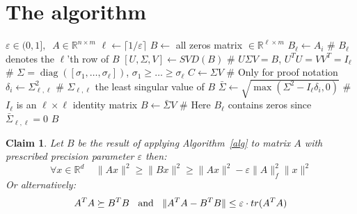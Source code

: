 \documentclass[]{article}
\newcommand{\R}{{\mathbb R}}
\newcommand{\eps}{\varepsilon}
\newcommand{\diag}{\operatorname{diag}}
\newcommand{\FD}{Frequent-Directions}
\newtheorem{claim}{Claim}
\begin{document}
\section{The algorithm}\label{thealg}

\begin{algorithm} 
\caption{\FD}
\label{alg}
\begin{algorithmic}
 $\eps \in (0,1], \;\;A \in \R^{n \times m}$ 
\STATE $\ell \leftarrow \lceil 1/\eps \rceil$
\STATE $B \leftarrow $ all zeros matrix $\in \R^{\ell \times m}$  
	\STATE $B_{\ell} \leftarrow A_i$  \hfill \# $B_{\ell}$ denotes the $\ell$'th row of $B$
	\STATE $[U,\Sigma,V] \leftarrow SVD(B)$  \hfill \# $U \Sigma V = B$,  \;$U^{T}U = VV^{T} = I_{\ell}$
	\STATE \hfill \# $\Sigma = \diag([\sigma_1,\ldots,\sigma_\ell])$,  \;$\sigma_1 \ge \ldots \ge \sigma_\ell$
	\STATE $C \leftarrow  \Sigma V$  \hfill \# Only for proof notation
	\STATE $\delta_i \leftarrow \Sigma_{\ell,\ell}^2$ \hfill \# $\Sigma_{\ell,\ell}$ the least singular value of $B$
	\STATE $\bar{\Sigma} \leftarrow \sqrt{\max(\Sigma^2 - I_{\ell}\delta_i,0)}$ \hfill \# $I_{\ell}$ is an $\ell \times \ell$ identity matrix
	\STATE $B \leftarrow \bar{\Sigma} V$ \hfill \# Here $B_{\ell}$ contains zeros since $\bar{\Sigma}_{\ell,\ell} = 0$
\ENDFOR
{} $B$ 
\end{algorithmic}
\end{algorithm}

\begin{claim}
Let $B$ be the result of applying Algorithm~\ref{alg} to matrix $A$ with prescribed precision parameter $\eps$ then:
\[
\forall x\in \R^{d} \;\;\;\;  \|Ax\|^2  \ge \|Bx\|^2 \ge \|Ax\|^2 - \eps \|A\|_{f}^{2}\|x\|^2
\] 
\noindent Or alternatively:
\[
A^{T}A \succeq B^{T}B \mbox{\;\; and \;\;} \|A^{T}A - B^{T}B\| \le \eps\cdot tr(A^{T}A) 
\]
\end{claim}
\end{document}

